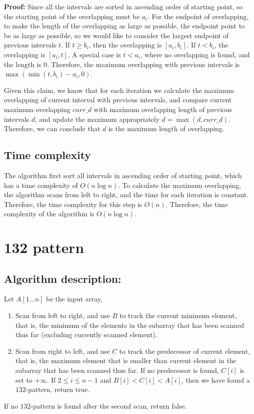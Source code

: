 \documentclass[paper=a4, fontsize=11pt]{scrartcl} %
\numberwithin{equation}{section} %
\numberwithin{figure}{section} %
\numberwithin{table}{section} %
\numberwithin{claimcounter}{section}
\begin{document}
\textbf{Proof:}
Since all the intervals are sorted in ascending order of starting point, so the
starting point of the overlapping must be $a_i$. For the endpoint of overlapping,
to make the length of the overlapping as large as possible, the endpoint point
to be as large as possible, so we would like to consider the largest endpoint
of previous intervals $t$. If $t \geq b_i$, then the overlapping is $[a_i, b_i]$.
If $t < b_i$, the overlapping is $[a_i, t]$. A special case is $t < a_i$, where
no overlapping is found, and the length is 0. Therefore, the maximum 
overlapping with previous intervals is $\max(\min(t, b_i) - a_i, 0)$.

Given this claim, we know that for each iteration we calculate the maximum
overlapping of current interval with previous intervals, and compare current 
maximum overlapping $curr\_d$ with maximum overlapping length of previous
intervals $d$,
and update the maximum appropriately $d = \max(d, curr\_d)$. Therefore, we can
conclude that $d$ is the maximum length of overlapping.

\subsection*{Time complexity}
The algorithm first sort all intervals in ascending order of starting point,
which has a time complexity of $O(n\log n)$. To calculate the maximum
overlapping, the algorithm scans from left to right, and the time for each
iteration is constant. Therefore, the time complexity for this step is $O(n)$.
Therefore, the time complexity of the algorithm is $O(n\log n)$.

\section{132 pattern}
\subsection*{Algorithm description:}
Let $A[1...n]$ be the input array,
\begin{enumerate}
\item Scan from left to right, and use $B$ to track the current minimum element,
that is, the minimum of the elements in the subarray that has been scanned thus 
far (excluding currently scanned element).

\item Scan from right to left, and use $C$ to track the predecessor of current
element, that is, the maximum element that is smaller than current element in
the subarray that has been scanned thus far. If no predecessor is found, $C[i]$
is set to $+\infty$. If $2 \leq i \leq n-1$ and $B[i] < C[i] < A[i]$, then we have found a
$132$-pattern, return true. 

\end{enumerate}
If no $132$-pattern is found after the second scan, return false.
\end{document}
